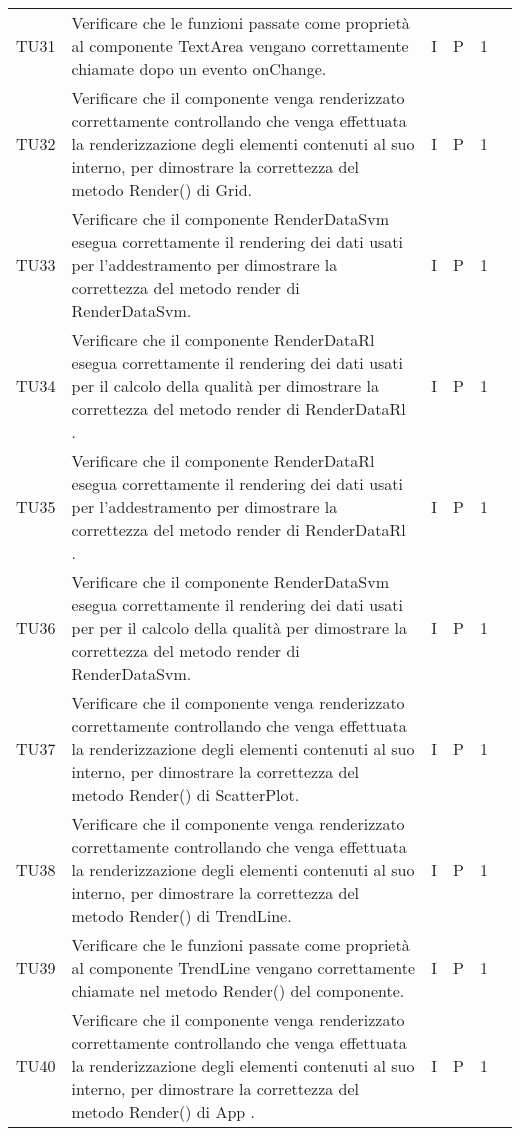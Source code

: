 \begin{longtable} {
		>{}p{12mm}
		>{}p{79.5mm}
		>{}p{9mm}
		>{}p{8mm}
		>{}p{14mm}
		>{}p{0mm}}
	TU31		& Verificare che le funzioni passate come proprietà al componente TextArea vengano correttamente chiamate dopo un evento onChange. & I & P & 1 & \TBstrut \\ [2mm]
	TU32		& Verificare che il componente venga renderizzato correttamente controllando che venga effettuata la renderizzazione degli elementi contenuti al suo interno, per dimostrare la correttezza del metodo Render() di Grid. & I & P & 1 & \TBstrut \\ [2mm]
	TU33		& Verificare che il componente RenderDataSvm esegua correttamente il rendering dei dati usati per l'addestramento per dimostrare la correttezza del metodo render di RenderDataSvm. & I & P & 1 & \TBstrut \\ [2mm]
	TU34		& Verificare che il componente RenderDataRl esegua correttamente il rendering dei dati usati per il calcolo della qualità per dimostrare la correttezza del metodo render di RenderDataRl . & I & P & 1 & \TBstrut \\ [2mm]
	TU35		& Verificare che il componente RenderDataRl esegua correttamente il rendering dei dati usati per l'addestramento per dimostrare la correttezza del metodo render di RenderDataRl . & I & P & 1 & \TBstrut \\ [2mm]
	TU36		& Verificare che il componente RenderDataSvm esegua correttamente il rendering dei dati usati per per il calcolo della qualità per dimostrare la correttezza del metodo render di RenderDataSvm. & I & P & 1 & \TBstrut \\ [2mm]
	TU37		& Verificare che il componente venga renderizzato correttamente controllando che venga effettuata la renderizzazione degli elementi contenuti al suo interno, per dimostrare la correttezza del metodo Render() di ScatterPlot. & I & P & 1 & \TBstrut \\ [2mm]
	TU38		& Verificare che il componente venga renderizzato correttamente controllando che venga effettuata la renderizzazione degli elementi contenuti al suo interno, per dimostrare la correttezza del metodo Render() di TrendLine. & I & P & 1 & \TBstrut \\ [2mm]
	TU39		& Verificare che le funzioni passate come proprietà al componente TrendLine vengano correttamente chiamate nel metodo Render() del componente. & I & P & 1 & \TBstrut \\ [2mm]
	TU40		& Verificare che il componente venga renderizzato correttamente controllando che venga effettuata la renderizzazione degli elementi contenuti al suo interno, per dimostrare la correttezza del metodo Render() di App . & I & P & 1 & \TBstrut \\ [2mm]


\end{longtable}
